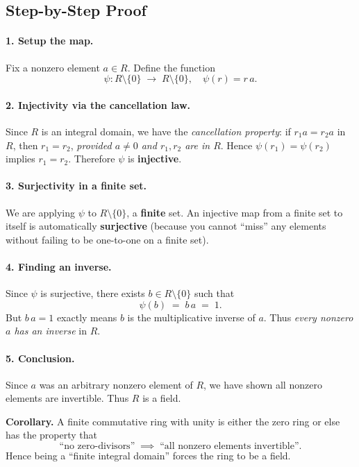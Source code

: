 \documentclass[12pt]{article}
\theoremstyle{definition} %
\theoremstyle{plain} %
\begin{document}
\subsection*{Step-by-Step Proof}

\paragraph{1. Setup the map.}
Fix a nonzero element $a \in R$.  
Define the function
\[
  \psi : R \setminus \{0\} \;\to\; R \setminus \{0\}, 
  \quad
  \psi(r) = r\,a.
\]

\paragraph{2. Injectivity via the cancellation law.}
Since $R$ is an integral domain, we have the \emph{cancellation property}:
if $r_1 a = r_2 a$ in $R$, then $r_1 = r_2$, \emph{provided $a \neq 0$ and $r_1, r_2$ are in $R$}.  
Hence $\psi(r_1) = \psi(r_2)$ implies $r_1 = r_2$.  
Therefore $\psi$ is \textbf{injective}.

\paragraph{3. Surjectivity in a finite set.}
We are applying $\psi$ to $R\setminus\{0\}$, a \textbf{finite} set.  
An injective map from a finite set to itself is automatically \textbf{surjective} 
(because you cannot ``miss'' any elements without failing to be one-to-one on a finite set).

\paragraph{4. Finding an inverse.}
Since $\psi$ is surjective, there exists $b \in R\setminus\{0\}$ such that
\[
  \psi(b) \;=\; b\,a \;=\; 1.
\]
But $b\,a = 1$ exactly means $b$ is the multiplicative inverse of $a$.  
Thus \emph{every nonzero $a$ has an inverse} in $R$.

\paragraph{5. Conclusion.}
Since $a$ was an arbitrary nonzero element of $R$, we have shown all nonzero elements are invertible. 
Thus $R$ is a field.

\bigskip

\noindent
\textbf{Corollary.}  
A finite commutative ring with unity is either the zero ring or else has the property that 
\[
  \text{``no zero-divisors''} \;\implies\; \text{``all nonzero elements invertible''}.
\]
Hence being a ``finite integral domain'' forces the ring to be a field.
\end{document}
